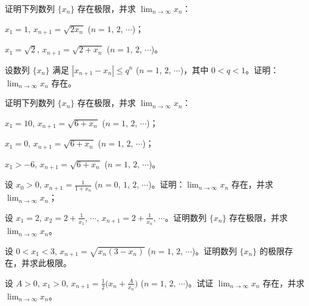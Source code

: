 	\begin{ti}
		证明下列数列 $\{x_n\}$ 存在极限，并求 $\lim_{n \to \infty} x_n$：
		\begin{xiaoti}
			\item $x_1 = 1$, $x_{n+1} = \sqrt{2x_n}$ ($n=1$, $2$, $\cdots$)；
			\item $x_1 = \sqrt{2}$, $x_{n+1} = \sqrt{2+x_n}$ ($n=1$, $2$, $\cdots$)。
		\end{xiaoti}
	\end{ti}

	\begin{ti}
		设数列 $\{x_n\}$ 满足 $|x_{n+1} - x_n| \leq q^n$ ($n=1$, $2$, $\cdots$)，其中 $0<q<1$。证明：$\lim_{n \to \infty} x_n$ 存在。
	\end{ti}

	\begin{ti}\label{sec:1.1.1-13}
		证明下列数列 $\{x_n\}$ 存在极限，并求 $\lim_{n \to \infty} x_n$：
		\begin{xiaoti}
			\item $x_1 = 10$, $x_{n+1} = \sqrt{6+x_n}$ ($n=1$, $2$, $\cdots$)；
			\item $x_1 = 0$, $x_{n+1} = \sqrt{6+x_n}$ ($n=1$, $2$, $\cdots$)；
			\item $x_1 > -6$, $x_{n+1} = \sqrt{6+x_n}$ ($n=1$, $2$, $\cdots$)。
		\end{xiaoti}
	\end{ti}

	\begin{ti}
		\begin{xiaoti}
			\item 设 $x_0 > 0$, $x_{n+1} = \frac{1}{1+x_n}$ ($n=0$, $1$, $2$, $\cdots$)。证明：$\lim_{n \to \infty} x_n$ 存在，并求 $\lim_{n \to \infty} x_n$；
			\item 设 $x_1 = 2$, $x_2 = 2 + \frac{1}{x_1}$, $\cdots$, $x_{n+1} = 2 + \frac{1}{x_n}$, $\cdots$。证明数列 $\{x_n\}$ 存在极限，并求 $\lim_{n \to \infty} x_n$。
		\end{xiaoti}
	\end{ti}

	\begin{ti}
		设 $0<x_1<3$, $x_{n+1} = \sqrt{x_n(3-x_n)}$ ($n=1$, $2$, $\cdots$)。证明数列 $\{x_n\}$ 的极限存在，并求此极限。
	\end{ti}

	\begin{ti}
		设 $A>0$, $x_1>0$, $x_{n+1} = \frac{1}{2} \bigl( x_n + \frac{A}{x_n} \bigr)$ ($n=1$, $2$, $\cdots$)。试证 $\lim_{n \to \infty} x_n$ 存在，并求 $\lim_{n \to \infty} x_n$。
	\end{ti}

